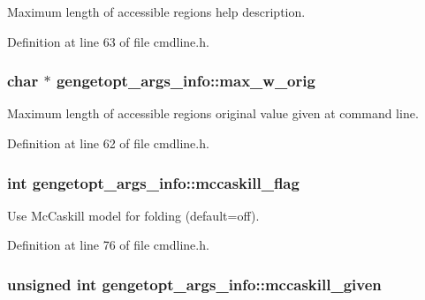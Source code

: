 Maximum length of accessible regions help description. 



Definition at line 63 of file cmdline.\+h.

\hypertarget{structgengetopt__args__info_a13203309b03664cded43fc7c50065c15}{
\subsubsection[{max\+\_\+w\+\_\+orig}]{\setlength{\rightskip}{0pt plus 5cm}char $\ast$ gengetopt\+\_\+args\+\_\+info\+::max\+\_\+w\+\_\+orig}}\label{structgengetopt__args__info_a13203309b03664cded43fc7c50065c15}


Maximum length of accessible regions original value given at command line. 



Definition at line 62 of file cmdline.\+h.

\hypertarget{structgengetopt__args__info_a2c35d30cec02884776c507be1f1c22ed}{
\subsubsection[{mccaskill\+\_\+flag}]{\setlength{\rightskip}{0pt plus 5cm}int gengetopt\+\_\+args\+\_\+info\+::mccaskill\+\_\+flag}}\label{structgengetopt__args__info_a2c35d30cec02884776c507be1f1c22ed}


Use Mc\+Caskill model for folding (default=off). 



Definition at line 76 of file cmdline.\+h.

\hypertarget{structgengetopt__args__info_abdb41a52bf90de52d706f3a4b768fff1}{
\subsubsection[{mccaskill\+\_\+given}]{\setlength{\rightskip}{0pt plus 5cm}unsigned int gengetopt\+\_\+args\+\_\+info\+::mccaskill\+\_\+given}}\label{structgengetopt__args__info_abdb41a52bf90de52d706f3a4b768fff1}


